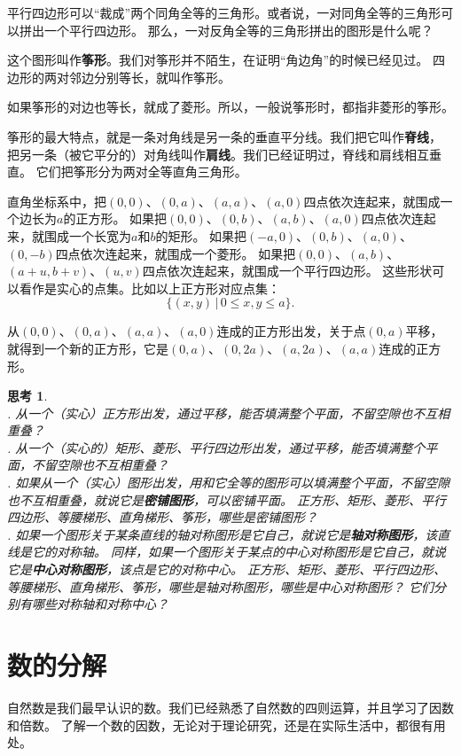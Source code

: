 \documentclass[12pt,UTF8]{ctexbook}
\newtheorem{sk}{思考}[section]
\begin{document}
平行四边形可以“裁成”两个同角全等的三角形。或者说，一对同角全等的三角形可以拼出一个平行四边形。
那么，一对反角全等的三角形拼出的图形是什么呢？

这个图形叫作\textbf{筝形}。我们对筝形并不陌生，在证明“角边角”的时候已经见过。
四边形的两对邻边分别等长，就叫作筝形。

如果筝形的对边也等长，就成了菱形。所以，一般说筝形时，都指非菱形的筝形。

筝形的最大特点，就是一条对角线是另一条的垂直平分线。我们把它叫作\textbf{脊线}，
把另一条（被它平分的）对角线叫作\textbf{肩线}。我们已经证明过，脊线和肩线相互垂直。
它们把筝形分为两对全等直角三角形。

直角坐标系中，把$(0,0)$、$(0,a)$、$(a,a)$、$(a,0)$四点依次连起来，就围成一个边长为$a$的正方形。
如果把$(0,0)$、$(0,b)$、$(a,b)$、$(a,0)$四点依次连起来，就围成一个长宽为$a$和$b$的矩形。
如果把$(-a,0)$、$(0,b)$、$(a,0)$、$(0,-b)$四点依次连起来，就围成一个菱形。
如果把$(0,0)$、$(a,b)$、$(a+u,b+v)$、$(u,v)$四点依次连起来，就围成一个平行四边形。
这些形状可以看作是实心的点集。比如以上正方形对应点集：
$$\{(x,y) \,|\, 0\leqslant x, y \leqslant a\}.$$

从$(0,0)$、$(0,a)$、$(a,a)$、$(a,0)$连成的正方形出发，关于点$(0, a)$平移，
就得到一个新的正方形，它是$(0,a)$、$(0,2a)$、$(a,2a)$、$(a,a)$连成的正方形。

\begin{sk}\label{sk:5-3-0}
    \mbox{}\\
    . 从一个（实心）正方形出发，通过平移，能否填满整个平面，不留空隙也不互相重叠？\\
    . 从一个（实心的）矩形、菱形、平行四边形出发，通过平移，能否填满整个平面，不留空隙也不互相重叠？\\    
    . 如果从一个（实心）图形出发，用和它全等的图形可以填满整个平面，不留空隙也不互相重叠，就说它是\textbf{密铺图形}，可以密铺平面。
    正方形、矩形、菱形、平行四边形、等腰梯形、直角梯形、筝形，哪些是密铺图形？\\    
    . 如果一个图形关于某条直线的轴对称图形是它自己，就说它是\textbf{轴对称图形}，该直线是它的对称轴。
    同样，如果一个图形关于某点的中心对称图形是它自己，就说它是\textbf{中心对称图形}，该点是它的对称中心。
    正方形、矩形、菱形、平行四边形、等腰梯形、直角梯形、筝形，哪些是轴对称图形，哪些是中心对称图形？
    它们分别有哪些对称轴和对称中心？
\end{sk}

\chapter{数的分解}
自然数是我们最早认识的数。我们已经熟悉了自然数的四则运算，并且学习了因数和倍数。
了解一个数的因数，无论对于理论研究，还是在实际生活中，都很有用处。
\end{document}
